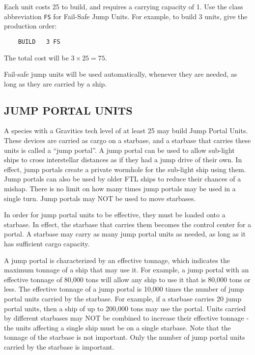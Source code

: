 \documentclass[10pt,titlepage]{article}
\begin{document}
Each unit costs 25 to build, and requires a carrying capacity of 1.  Use the
class abbreviation \texttt{FS} for Fail-Safe Jump Units.  For example, to build 3
units, give the production order:

\begin{verbatim}
	BUILD	3 FS\end{verbatim} 

\noindent The total cost will be $3 \times 25 = 75$.

\noindent Fail-safe jump units will be used automatically, whenever they are needed, as
long as they are carried by a ship.

\subsection{JUMP PORTAL UNITS}

A species with a Gravitics tech level of at least 25 may build Jump Portal
Units.  These devices are carried as cargo on a starbase, and a starbase that
carries these units is called a ``jump portal''.  A jump portal can be used to
allow sub-light ships to cross interstellar distances as if they had a jump
drive of their own.  In effect, jump portals create a private wormhole for the
sub-light ship using them.  Jump portals can also be used by older FTL ships
to reduce their chances of a mishap.  There is no limit on how many times jump
portals may be used in a single turn.  Jump portals may NOT be used to move
starbases.

In order for jump portal units to be effective, they must be loaded onto a
starbase.  In effect, the starbase that carries them becomes the control center
for a portal.  A starbase may carry as many jump portal units as needed, as
long as it has sufficient cargo capacity.

A jump portal is characterized by an effective tonnage, which indicates the
maximum tonnage of a ship that may use it.  For example, a jump portal with
an effective tonnage of 80,000 tons will allow any ship to use it that is
80,000 tons or less.  The effective tonnage of a jump portal is 10,000 times
the number of jump portal units carried by the starbase.  For example, if a
starbase carries 20 jump portal units, then a ship of up to 200,000 tons may
use the portal.  Units carried by different starbases may NOT be combined to
increase their effective tonnage - the units affecting a single ship must be
on a single starbase.  Note that the tonnage of the starbase is not important.
Only the number of jump portal units carried by the starbase is important.
\end{document}
